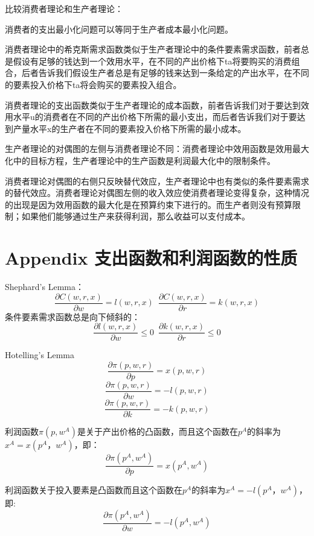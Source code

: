 \documentclass{article}
\begin{document}
\hspace*{\fill}

比较消费者理论和生产者理论：

消费者的支出最小化问题可以等同于生产者成本最小化问题。

消费者理论中的希克斯需求函数类似于生产者理论中的条件要素需求函数，前者总是假设有足够的钱达到一个效用水平，在不同的产出价格下ta将要购买的消费组合，后者告诉我们假设生产者总是有足够的钱来达到一条给定的产出水平，在不同的要素投入价格下ta将会购买的要素投入组合。

消费者理论的支出函数类似于生产者理论的成本函数，前者告诉我们对于要达到效用水平u的消费者在不同的产出价格下所需的最小支出，而后者告诉我们对于要达到产量水平x的生产者在不同的要素投入价格下所需的最小成本。

生产者理论的对偶图的左侧与消费者理论不同：消费者理论中效用函数是效用最大化中的目标方程，生产者理论中的生产函数是利润最大化中的限制条件。

消费者理论对偶图的右侧只反映替代效应，生产者理论中也有类似的条件要素需求的替代效应。消费者理论对偶图左侧的收入效应使消费者理论变得复杂，这种情况的出现是因为效用函数的最大化是在预算约束下进行的。而生产者则没有预算限制；如果他们能够通过生产来获得利润，那么收益可以支付成本。

\section{Appendix 支出函数和利润函数的性质}
Shephard's Lemma：
\[
\frac{\partial C(w,r,x)}{\partial w}=l(w,r,x)\enspace \frac{\partial C(w,r,x)}{\partial r}=k(w,r,x)
\]
条件要素需求函数总是向下倾斜的：
\[
\frac{\partial l(w,r,x)}{\partial w}\le0\enspace \frac{\partial k(w,r,x)}{\partial r}\le0
\]

Hotelling's Lemma
\[
\frac{\partial \pi(p,w,r)}{\partial p}=x(p,w,r)
\]
\[
\frac{\partial \pi(p,w,r)}{\partial w}=-l(p,w,r)
\]
\[
\frac{\partial \pi(p,w,r)}{\partial k}=-k(p,w,r)
\]

利润函数$ \pi(p,w^A) $是关于产出价格的凸函数，而且这个函数在$ p^A $的斜率为$ x^A=x(p^A，w^A) $，即：
\[
\frac{\partial \pi(p^A,w^A)}{\partial p}=x(p^A,w^A)
\]

利润函数关于投入要素是凸函数而且这个函数在$ p^A $的斜率为$ x^A=-l(p^A，w^A) $，即:
\[
\frac{\partial \pi(p^A,w^A)}{\partial w}=-l(p^A,w^A)
\]
\end{document}
